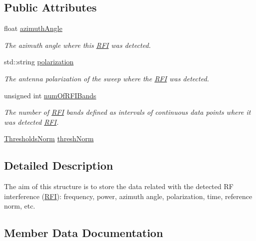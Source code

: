 \subsection*{Public Attributes}
\begin{DoxyCompactItemize}
\item 
\mbox{\label{structRFI_aeb10ac61d7897dbaa6971607e56ea244}} 
float \hyperlink{structRFI_aeb10ac61d7897dbaa6971607e56ea244}{azimuth\+Angle}
\begin{DoxyCompactList}\small\item\em The azimuth angle where this \hyperlink{structRFI}{R\+FI} was detected. \end{DoxyCompactList}\item 
\mbox{\label{structRFI_a6c5345dd1141e8bf80b4e1cf32c092de}} 
std\+::string \hyperlink{structRFI_a6c5345dd1141e8bf80b4e1cf32c092de}{polarization}
\begin{DoxyCompactList}\small\item\em The antenna polarization of the sweep where the \hyperlink{structRFI}{R\+FI} was detected. \end{DoxyCompactList}\item 
\mbox{\label{structRFI_aefedd07c1a853fb1c8363a0f436d3973}} 
unsigned int \hyperlink{structRFI_aefedd07c1a853fb1c8363a0f436d3973}{num\+Of\+R\+F\+I\+Bands}
\begin{DoxyCompactList}\small\item\em The number of \hyperlink{structRFI}{R\+FI} bands defined as intervals of continuous data points where it was detected \hyperlink{structRFI}{R\+FI}. \end{DoxyCompactList}\item 
\hyperlink{structRFI_a18cfa7d24274bbcd14acc6b513860cb0}{Thresholds\+Norm} \hyperlink{structRFI_a48905b3dcebf7127bd31315a21a24599}{thresh\+Norm}
\end{DoxyCompactItemize}


\subsection{Detailed Description}
The aim of this structure is to store the data related with the detected RF interference (\hyperlink{structRFI}{R\+FI})\+: frequency, power, azimuth angle, polarization, time, reference norm, etc. 

\subsection{Member Data Documentation}
\mbox{\label{structRFI_a48905b3dcebf7127bd31315a21a24599}} 
